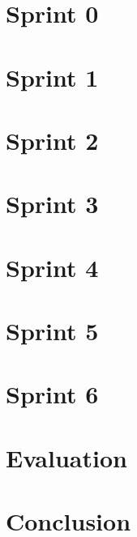 \documentclass[11pt]{report}
\begin{document}
\chapter{Sprint 0}


\chapter{Sprint 1}


\chapter{Sprint 2}


\chapter{Sprint 3}


\chapter{Sprint 4}


\chapter{Sprint 5}


\chapter{Sprint 6}


\chapter{Evaluation}


\chapter{Conclusion}


\begin{flushleft}
	
	
\end{flushleft}

\appendix

\end{document}
